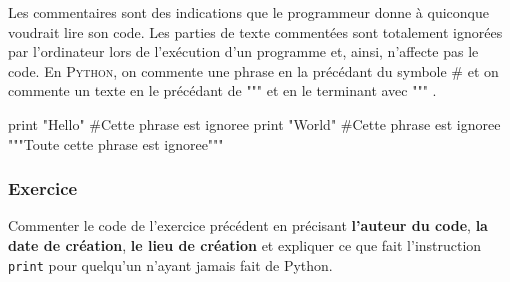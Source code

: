 Les commentaires sont des indications que le programmeur donne à quiconque voudrait lire son code. Les parties de texte commentées sont totalement ignorées par l'ordinateur lors de l'exécution d'un programme et, ainsi, n'affecte pas le code. En \textsc{Python}, on commente une phrase en la précédant du symbole \# et on commente un texte en le précédant de """ et en le terminant avec """ .
\begin{python}
print "Hello"
#Cette phrase est ignoree
print "World" #Cette phrase est ignoree
"""Toute
cette
phrase
est
ignoree"""
\end{python}
\subsubsection{Exercice}
    Commenter le code de l'exercice précédent en précisant \textbf{l'auteur du code}, \textbf{la date de création}, \textbf{le lieu de création} et expliquer ce que fait l'instruction \texttt{print} pour quelqu'un n'ayant jamais fait de Python. 